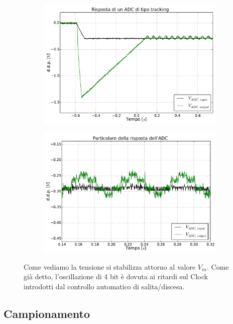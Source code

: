 \begin{figure}[htpc]
\centering
	\begin{subfigure}[hc]{.44\textwidth}
		\centering
		\includegraphics[width=.99\textwidth]{../E13/latex/tracker.pdf}
		\caption{}
		\label{gr13:track}
        \end{subfigure}%
        \begin{subfigure}[hc]{.49\textwidth}
		\centering
		\includegraphics[width=.99\textwidth]{../E13/latex/zoom.pdf}
		\caption{}
		\label{gr13:zoom}
        \end{subfigure}
\caption{Come vediamo la tensione si stabilizza attorno al valore $V_{in}$. Come già detto, l'oscillazione di 4 bit è dovuta ai ritardi sul Clock introdotti dal controllo automatico di salita/discesa.}
\end{figure}

\subsection{Campionamento}

